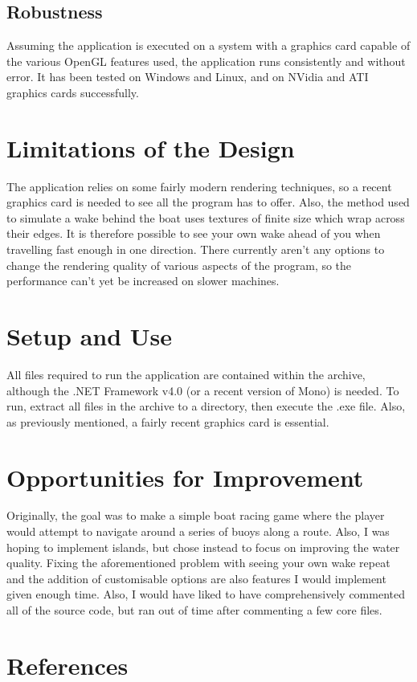 \documentclass[a4paper,11pt]{article}
\begin{document}
\subsection{Robustness}
Assuming the application is executed on a system with a graphics card capable of the various OpenGL features used, the application runs consistently and without error. It has been tested on Windows and Linux, and on NVidia and ATI graphics cards successfully.

\section{Limitations of the Design}
The application relies on some fairly modern rendering techniques, so a recent graphics card is needed to see all the program has to offer. Also, the method used to simulate a wake behind the boat uses textures of finite size which wrap across their edges. It is therefore possible to see your own wake ahead of you when travelling fast enough in one direction. There currently aren't any options to change the rendering quality of various aspects of the program, so the performance can't yet be increased on slower machines.

\section{Setup and Use}
All files required to run the application are contained within the archive, although the .NET Framework v4.0 (or a recent version of Mono) is needed. To run, extract all files in the archive to a directory, then execute the .exe file. Also, as previously mentioned, a fairly recent graphics card is essential.

\section{Opportunities for Improvement}
Originally, the goal was to make a simple boat racing game where the player would attempt to navigate around a series of buoys along a route. Also, I was hoping to implement islands, but chose instead to focus on improving the water quality. Fixing the aforementioned problem with seeing your own wake repeat and the addition of customisable options are also features I would implement given enough time. Also, I would have liked to have comprehensively commented all of the source code, but ran out of time after commenting a few core files.

\section{References}
\end{document}
